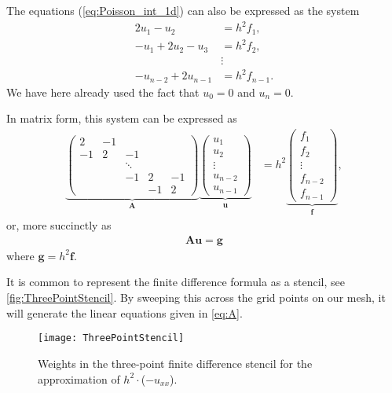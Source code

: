 The equations (\ref{eq:Poisson_int_1d}) can also be expressed as the system
\begin{align*}
  2 u_1 - u_2 &= h^2 f_1, \\
  -u_1 + 2 u_2 - u_3 &= h^2 f_2, \\
  &\vdots \\
  -u_{n-2} + 2 u_{n-1} &= h^2 f_{n-1}.
\end{align*}
We have here already used the fact that $u_0=0$ and $u_{n}=0$.

In matrix form, this system can be expressed as
\begin{align}
 \underbrace{ \begin{pmatrix}
    2 & -1 & & & \\
    -1 & 2 & -1 & & \\
    & & \ddots & & \\
    & & -1 & 2 & -1 \\
    & & & -1 & 2
  \end{pmatrix}
  }_{\bm A}
  \underbrace{ \begin{pmatrix}
    u_1 \\
    u_2 \\
    \vdots \\
    u_{n-2} \\
    u_{n-1}
  \end{pmatrix}
  }_{\bm u}
  &= h^2
  \underbrace{ \begin{pmatrix}
    f_1 \\
    f_2 \\
    \vdots \\
    f_{n-2} \\
    f_{n-1}
  \end{pmatrix}
  }_{\bm f} ,
  \label{eq:A}
\end{align}
or, more succinctly as
\begin{align*}
  \bm A \bm u = \bm g
\end{align*}
where $\bm g = h^2 \bm f$.

It is common to represent the finite difference formula as a stencil, see
\autoref{fig:ThreePointStencil}. By sweeping this across the grid points on our
mesh, it will generate the linear equations given in \eqref{eq:A}.
\begin{figure}
  \centering
  \texttt{[image: ThreePointStencil]}
  \caption{
    Weights in the three-point finite difference stencil for the approximation
    of $h^2\cdot$($-u_{xx}$).
  }
  \label{fig:ThreePointStencil}
\end{figure}


